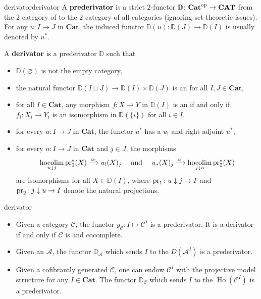 \begin{topic}{derivator}{derivator}
    A \textbf{prederivator} is a strict $2$-functor $\mathbb{D} \colon \textbf{Cat}^\textup{op} \to \textbf{CAT}$ from the $2$-category of  to the $2$-category of all categories (ignoring set-theoretic issues). For any $u \colon I \to J$ in $\textbf{Cat}$, the induced functor $\mathbb{D}(u) \colon \mathbb{D}(J) \to \mathbb{D}(I)$ is usually denoted by $u^*$.

    A \textbf{derivator} is a prederivator $\mathbb{D}$ such that
    \begin{itemize}
        \item $\mathbb{D}(\varnothing)$ is not the empty category,
        \item the natural functor $\mathbb{D}(I \sqcup J) \to \mathbb{D}(I) \times \mathbb{D}(J)$ is an  for all $I, J \in \textbf{Cat}$,
        \item for all $I \in \textbf{Cat}$, any morphism $f \colon X \to Y$ in $\mathbb{D}(I)$ is an  if and only if $f_i \colon X_i \to Y_i$ is an isomorphism in $\mathbb{D}(\{ i \})$ for all $i \in I$.
        \item for every $u \colon I \to J$ in $\textbf{Cat}$, the functor $u^*$ has a  $u_!$ and right adjoint $u^*$,
        \item for every $u \colon I \to J$ in $\textbf{Cat}$ and $j \in J$, the morphisms
        \[ \operatorname*{hocolim}_{u \downarrow j} \textup{pr}_1^*(X) \xrightarrow{\alpha_!} u_!(X)_j \quad \textup{ and } \quad u_*(X)_j \xrightarrow{\alpha_!} \operatorname*{hocolim}_{j \downarrow u} \textup{pr}_2^*(X) \]
        are isomorphisms for all $X \in \mathbb{D}(I)$, where $\textup{pr}_1 \colon u \downarrow j \to I$ and $\textup{pr}_2 \colon j \downarrow u \to I$ denote the natural projections.
    \end{itemize}
\end{topic}

\begin{example}{derivator}
    \begin{itemize}
        \item Given a category $\mathcal{C}$, the functor $y_\mathcal{C} : I \mapsto \mathcal{C}^I$ is a prederivator. It is a derivator if and only if $\mathcal{C}$ is  and cocomplete.
        \item Given an  $\mathcal{A}$, the functor $\mathbb{D}_\mathcal{A}$ which sends $I$ to the  $D(\mathcal{A}^I)$ is a prederivator.
        \item Given a cofibrantly generated  $\mathcal{C}$, one can endow $\mathcal{C}^I$ with the projective model structure for any $I \in \textbf{Cat}$. The functor $\mathbb{D}_\mathcal{C}$ which sends $I$ to the  $\operatorname{Ho}(\mathcal{C}^I)$ is a prederivator.
    \end{itemize}
\end{example}

